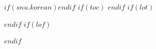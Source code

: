 $if(snu.korean)$\renewcommand{\snuchapterformat}{제 \thechapter\ 장}$endif$
\renewcommand{\contentsname}{$snu.contents-label$}
\renewcommand{\listtablename}{$snu.tables-label$}
\renewcommand{\listfigurename}{$snu.figures-label$}
\renewcommand{\chaptername}{$snu.chapter-label$}
\renewcommand{\tablename}{$snu.table-label$}
\renewcommand{\figurename}{$snu.figure-label$}
$if(toc)$
\setcounter{tocdepth}{$toc-depth$}
\tableofcontents
\clearpage
$endif$
$if(lot)$\listoftables\clearpage$endif$
$if(lof)$\listoffigures\clearpage$endif$
